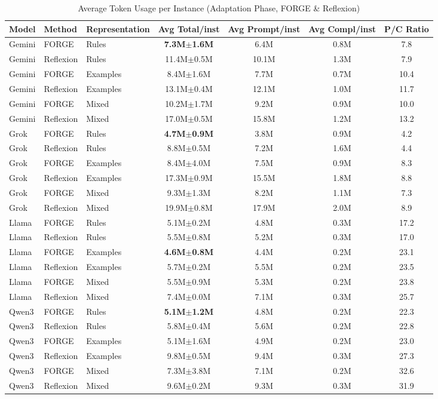\documentclass[sigconf]{acmart}
\begin{document}
\begin{table}[htbp]
\centering
\scriptsize
\caption{Average Token Usage per Instance (Adaptation Phase, FORGE \& Reflexion)}
\label{tab:token-usage}
\begin{tabular}{lll cccc}
\toprule
\textbf{Model} & \textbf{Method} & \textbf{Representation} & \textbf{Avg Total/inst} & \textbf{Avg Prompt/inst} & \textbf{Avg Compl/inst} & \textbf{P/C Ratio} \\
\midrule
Gemini & FORGE & Rules & \textbf{7.3M$\pm$1.6M} & 6.4M & 0.8M & 7.8 \\
Gemini & Reflexion & Rules & 11.4M$\pm$0.5M & 10.1M & 1.3M & 7.9 \\
Gemini & FORGE & Examples & 8.4M$\pm$1.6M & 7.7M & 0.7M & 10.4 \\
Gemini & Reflexion & Examples & 13.1M$\pm$0.4M & 12.1M & 1.0M & 11.7 \\
Gemini & FORGE & Mixed & 10.2M$\pm$1.7M & 9.2M & 0.9M & 10.0 \\
Gemini & Reflexion & Mixed & 17.0M$\pm$0.5M & 15.8M & 1.2M & 13.2 \\
\midrule
Grok & FORGE & Rules & \textbf{4.7M$\pm$0.9M} & 3.8M & 0.9M & 4.2 \\
Grok & Reflexion & Rules & 8.8M$\pm$0.5M & 7.2M & 1.6M & 4.4 \\
Grok & FORGE & Examples & 8.4M$\pm$4.0M & 7.5M & 0.9M & 8.3 \\
Grok & Reflexion & Examples & 17.3M$\pm$0.9M & 15.5M & 1.8M & 8.8 \\
Grok & FORGE & Mixed & 9.3M$\pm$1.3M & 8.2M & 1.1M & 7.3 \\
Grok & Reflexion & Mixed & 19.9M$\pm$0.8M & 17.9M & 2.0M & 8.9 \\
\midrule
Llama & FORGE & Rules & 5.1M$\pm$0.2M & 4.8M & 0.3M & 17.2 \\
Llama & Reflexion & Rules & 5.5M$\pm$0.8M & 5.2M & 0.3M & 17.0 \\
Llama & FORGE & Examples & \textbf{4.6M$\pm$0.8M} & 4.4M & 0.2M & 23.1 \\
Llama & Reflexion & Examples & 5.7M$\pm$0.2M & 5.5M & 0.2M & 23.5 \\
Llama & FORGE & Mixed & 5.5M$\pm$0.9M & 5.3M & 0.2M & 23.8 \\
Llama & Reflexion & Mixed & 7.4M$\pm$0.0M & 7.1M & 0.3M & 25.7 \\
\midrule
Qwen3 & FORGE & Rules & \textbf{5.1M$\pm$1.2M} & 4.8M & 0.2M & 22.3 \\
Qwen3 & Reflexion & Rules & 5.8M$\pm$0.4M & 5.6M & 0.2M & 22.8 \\
Qwen3 & FORGE & Examples & 5.1M$\pm$1.6M & 4.9M & 0.2M & 23.0 \\
Qwen3 & Reflexion & Examples & 9.8M$\pm$0.5M & 9.4M & 0.3M & 27.3 \\
Qwen3 & FORGE & Mixed & 7.3M$\pm$3.8M & 7.1M & 0.2M & 32.6 \\
Qwen3 & Reflexion & Mixed & 9.6M$\pm$0.2M & 9.3M & 0.3M & 31.9 \\
\bottomrule
\end{tabular}
\end{table}
\end{document}

